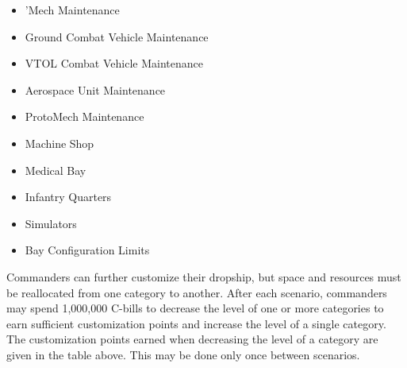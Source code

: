 \begin{itemize}

\item 'Mech Maintenance

\item Ground Combat Vehicle Maintenance

\item VTOL Combat Vehicle Maintenance

\item Aerospace Unit Maintenance

\item ProtoMech Maintenance

\item Machine Shop

\item Medical Bay

\item Infantry Quarters

\item Simulators

\item Bay Configuration Limits

\end{itemize}


Commanders can further customize their dropship, but space and resources must be reallocated from one category to another.
After each scenario, commanders may spend 1,000,000 C-bills to decrease the level of one or more categories to earn sufficient customization points and increase the level of a single category.
The customization points earned when decreasing the level of a category are given in the table above.
This may be done only once between scenarios.
